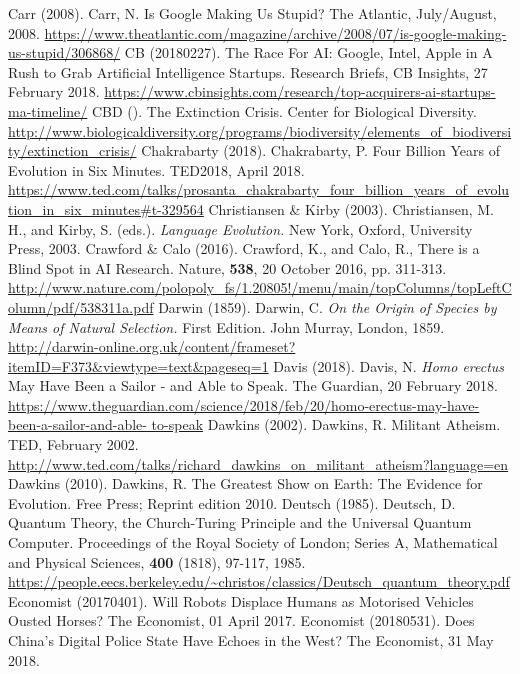 \begin{multicols}{2}
\begin{thebibliography}{99}
 Carr (2008). Carr, N. Is Google Making Us Stupid? The Atlantic, July/August, 2008. \url{https://www.theatlantic.com/magazine/archive/2008/07/is-google-making-us-stupid/306868/} 
 CB (20180227). The Race For AI: Google, Intel, Apple in A Rush to Grab Artificial Intelligence Startups. Research Briefs, CB Insights, 27 February 2018. \url{https://www.cbinsights.com/research/top-acquirers-ai-startups-ma-timeline/}
 CBD (). The Extinction Crisis. Center for Biological Diversity. \url{http://www.biologicaldiversity.org/programs/biodiversity/elements_of_biodiversity/extinction_crisis/}
 Chakrabarty (2018). Chakrabarty, P. Four Billion Years of Evolution in Six Minutes. TED2018, April 2018. \url{https://www.ted.com/talks/prosanta_chakrabarty_four_billion_years_of_evolution_in_six_minutes#t-329564}
 Christiansen \& Kirby (2003). Christiansen, M. H., and Kirby, S. (eds.). \textit{Language Evolution.} New York, Oxford, University Press, 2003.
 Crawford \& Calo (2016). Crawford, K., and Calo, R., There is a Blind Spot in AI Research. Nature, \textbf{538}, 20 October 2016, pp. 311-313. \url{http://www.nature.com/polopoly_fs/1.20805!/menu/main/topColumns/topLeftColumn/pdf/538311a.pdf}
 Darwin (1859). Darwin, C. \textit{On the Origin of Species by Means of Natural Selection.} First Edition. John Murray, London, 1859. \url{http://darwin-online.org.uk/content/frameset?itemID=F373&viewtype=text&pageseq=1} 
 Davis (2018). Davis, N. \textit{Homo erectus} May Have Been a Sailor - and Able to Speak. The Guardian, 20 February 2018. \url{https://www.theguardian.com/science/2018/feb/20/homo-erectus-may-have-been-a-sailor-and-able- to-speak}
 Dawkins (2002). Dawkins, R. Militant Atheism. TED, February 2002. \url{http://www.ted.com/talks/richard_dawkins_on_militant_atheism?language=en}
 Dawkins (2010). Dawkins, R. The Greatest Show on Earth: The Evidence for Evolution. Free Press; Reprint edition 2010.
 Deutsch (1985). Deutsch, D. Quantum Theory, the Church-Turing Principle and the Universal Quantum Computer. Proceedings of the Royal Society of London; Series A, Mathematical and Physical Sciences, \textbf{400} (1818), 97-117, 1985. \url{https://people.eecs.berkeley.edu/~christos/classics/Deutsch_quantum_theory.pdf}
 Economist (20170401). Will Robots Displace Humans as Motorised Vehicles Ousted Horses? The Economist, 01 April 2017.
 Economist (20180531). Does China's Digital Police State Have Echoes in the West? The Economist, 31 May 2018.

\end{thebibliography}
\end{multicols}

